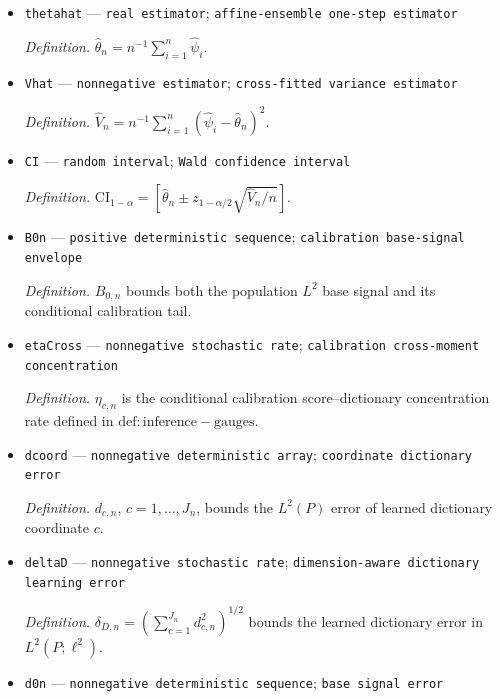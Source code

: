 \documentclass{article}
\begin{document}
\begin{itemize}
  \par\smallskip\noindent\emph{Definition.} \(\widehat\psi_i^{(-k,C\mid A)}\) uses construction-sample bridges, calibration-sample cutoff coefficients, and evaluation only on \(i\in\mathcal I_k\).
  \item \texttt{thetahat} --- \texttt{real estimator}; \texttt{affine-\allowbreak{}ensemble one-\allowbreak{}step estimator}
  \par\smallskip\noindent\emph{Definition.} \(\widehat\theta_n=n^{-1}\sum_{i=1}^n\widehat\psi_i\).
  \item \texttt{Vhat} --- \texttt{nonnegative estimator}; \texttt{cross-\allowbreak{}fitted variance estimator}
  \par\smallskip\noindent\emph{Definition.} \(\widehat V_n=n^{-1}\sum_{i=1}^n(\widehat\psi_i-\widehat\theta_n)^2\).
  \item \texttt{CI} --- \texttt{random interval}; \texttt{Wald confidence interval}
  \par\smallskip\noindent\emph{Definition.} \(\mathrm{CI}_{1-\alpha}=\left[\widehat\theta_n\pm z_{1-\alpha/2}\sqrt{\widehat V_n/n}\right]\).
  \item \texttt{B0n} --- \texttt{positive deterministic sequence}; \texttt{calibration base-\allowbreak{}signal envelope}
  \par\smallskip\noindent\emph{Definition.} \(B_{0,n}\) bounds both the population \(L^2\) base signal and its conditional calibration tail.
  \item \texttt{etaCross} --- \texttt{nonnegative stochastic rate}; \texttt{calibration cross-\allowbreak{}moment concentration}
  \par\smallskip\noindent\emph{Definition.} \(\eta_{c,n}\) is the conditional calibration score--dictionary concentration rate defined in \(\mathrm{def:inference-gauges}\).
  \item \texttt{dcoord} --- \texttt{nonnegative deterministic array}; \texttt{coordinate dictionary error}
  \par\smallskip\noindent\emph{Definition.} \(d_{c,n}\), \(c=1,\ldots,J_n\), bounds the \(L^2(P)\) error of learned dictionary coordinate \(c\).
  \item \texttt{deltaD} --- \texttt{nonnegative stochastic rate}; \texttt{dimension-\allowbreak{}aware dictionary learning error}
  \par\smallskip\noindent\emph{Definition.} \(\delta_{D,n}=(\sum_{c=1}^{J_n}d_{c,n}^2)^{1/2}\) bounds the learned dictionary error in \(L^2(P;\ell^2)\).
  \item \texttt{d0n} --- \texttt{nonnegative deterministic sequence}; \texttt{base signal error}

\end{itemize}
\end{document}
